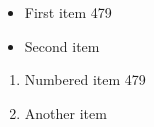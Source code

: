 \documentclass{article}
\begin{document}
\begin{itemize}
\item First item 479
\item Second item
\end{itemize}
\begin{enumerate}
\item Numbered item 479
\item Another item
\end{enumerate}
\end{document}
